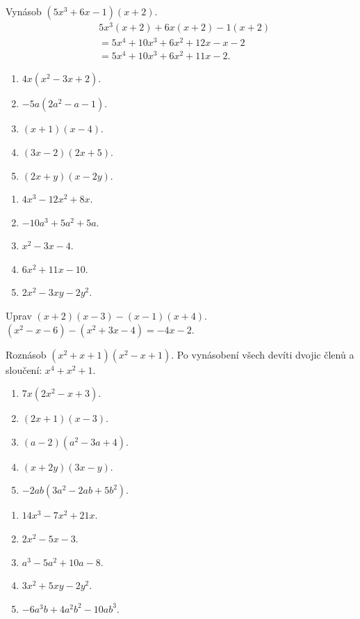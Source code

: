 \documentclass[11pt,a4paper]{article}
\begin{document}
\begin{prikladReseniBox}[title={Příklad 5}]
Vynásob $(5x^3+6x-1)(x+2)$.
\tcblower
\begin{align*}
&5x^3(x+2)+6x(x+2)-1(x+2)\\
&=5x^4+10x^3+6x^2+12x-x-2\\
&=5x^4+10x^3+6x^2+11x-2.
\end{align*}
\end{prikladReseniBox}
\begin{zadaniReseniBox}[title={Samostatná práce 1}]
\begin{enumerate}[label=\alph*)]
\item $4x(x^2-3x+2)$.
\item $-5a(2a^2-a-1)$.
\item $(x+1)(x-4)$.
\item $(3x-2)(2x+5)$.
\item $(2x+y)(x-2y)$.
\end{enumerate}
\tcblower
\begin{enumerate}[label=\alph*)]
\item $4x^3-12x^2+8x$.
\item $-10a^3+5a^2+5a$.
\item $x^2-3x-4$.
\item $6x^2+11x-10$.
\item $2x^2-3xy-2y^2$.
\end{enumerate}
\end{zadaniReseniBox}
\begin{zadaniReseniBox}[title={Samostatná práce 2}]
Uprav $(x+2)(x-3)-(x-1)(x+4)$.
\tcblower
$(x^2-x-6)-(x^2+3x-4)=-4x-2$.
\end{zadaniReseniBox}
\begin{zadaniReseniBox}[title={Rozšíření 1}]
Roznásob $(x^2+x+1)(x^2-x+1)$.
\tcblower
Po vynásobení všech devíti dvojic členů a sloučení: $x^4+x^2+1$.
\end{zadaniReseniBox}
\begin{zadaniReseniBox}[title={Domácí úkol}]
\begin{enumerate}[label=\alph*)]
\item $7x(2x^2-x+3)$.
\item $(2x+1)(x-3)$.
\item $(a-2)(a^2-3a+4)$.
\item $(x+2y)(3x-y)$.
\item $-2ab(3a^2-2ab+5b^2)$.
\end{enumerate}
\tcblower
\begin{enumerate}[label=\alph*)]
\item $14x^3-7x^2+21x$.
\item $2x^2-5x-3$.
\item $a^3-5a^2+10a-8$.
\item $3x^2+5xy-2y^2$.
\item $-6a^3b+4a^2b^2-10ab^3$.
\end{enumerate}
\end{zadaniReseniBox}
\end{document}
